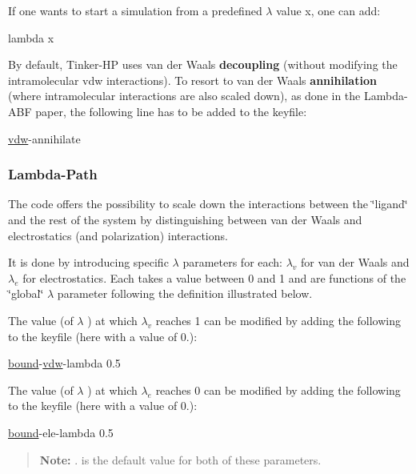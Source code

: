 If one wants to start a simulation from a predefined $ \lambda $ value {\ttfamily x}, one can add\-: 
\begin{DoxyCode}
lambda x
\end{DoxyCode}


By default, Tinker-\/\-H\-P uses van der Waals {\bfseries decoupling} (without modifying the intramolecular vdw interactions). To resort to van der Waals {\bfseries annihilation} (where intramolecular interactions are also scaled down), as done in the Lambda-\/\-A\-B\-F paper, the following line has to be added to the keyfile\-: 
\begin{DoxyCode}
\hyperlink{classvdw}{vdw}-annihilate
\end{DoxyCode}


\subsubsection*{Lambda-\/\-Path}

The code offers the possibility to scale down the interactions between the \char`\"{}ligand\char`\"{} and the rest of the system by distinguishing between van der Waals and electrostatics (and polarization) interactions.

It is done by introducing specific $ \lambda $ parameters for each\-: $ \lambda_v $ for van der Waals and $ \lambda_e $ for electrostatics. Each takes a value between 0 and 1 and are functions of the \char`\"{}global\char`\"{} $ \lambda $ parameter following the definition illustrated below.



The value (of $ \lambda $ ) at which $ \lambda_v $ reaches 1 can be modified by adding the following to the keyfile (here with a value of 0.)\-: 
\begin{DoxyCode}
\hyperlink{classbound}{bound}-\hyperlink{classvdw}{vdw}-lambda 0.5
\end{DoxyCode}


The value (of $ \lambda $ ) at which $ \lambda_e $ reaches 0 can be modified by adding the following to the keyfile (here with a value of 0.)\-: 
\begin{DoxyCode}
\hyperlink{classbound}{bound}-ele-lambda 0.5
\end{DoxyCode}


\begin{quotation}
{\bfseries Note\-:} {.} is the default value for both of these parameters.

\end{quotation}




